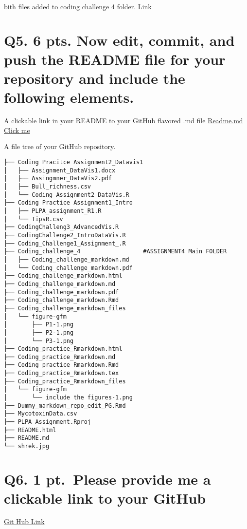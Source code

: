 \documentclass[
]{article}
\begin{document}
bith files added to coding challenge 4 folder.
\href{https://github.com/ppg0001/PLPA_Assignment/tree/main/Coding_challenge_4}{Link}

\section{Q5. 6 pts. Now edit, commit, and push the README file for your
repository and include the following
elements.}\label{q5.-6-pts.-now-edit-commit-and-push-the-readme-file-for-your-repository-and-include-the-following-elements.}

A clickable link in your README to your GitHub flavored .md file
\href{https://github.com/ppg0001/PLPA_Assignment/blob/main/Coding_challenge_4/Coding_challenge_markdown.md}{Readme.md
Click me}

A file tree of your GitHub repository.

\begin{verbatim}
├── Coding Pracitce Assignment2_Datavis1
│   ├── Assignment_DataVis1.docx
│   ├── Assingmner_DataVis2.pdf
│   ├── Bull_richness.csv
│   └── Coding_Assignment2_DataVis.R
├── Coding Practice Assignment1_Intro
│   ├── PLPA_assignment_R1.R
│   └── TipsR.csv
├── CodingChalleng3_AdvancedVis.R
├── CodingChallenge2_IntroDataVis.R
├── Coding_Challenge1_Assignment_.R
├── Coding_challenge_4                  #ASSIGNMENT4 Main FOLDER
│   ├── Coding_challenge_markdown.md
│   └── Coding_challenge_markdown.pdf
├── Coding_challenge_markdown.html
├── Coding_challenge_markdown.md
├── Coding_challenge_markdown.pdf
├── Coding_challenge_markdown.Rmd
├── Coding_challenge_markdown_files
│   └── figure-gfm
│       ├── P1-1.png
│       ├── P2-1.png
│       └── P3-1.png
├── Coding_practice_Rmarkdown.html
├── Coding_practice_Rmarkdown.md
├── Coding_practice_Rmarkdown.Rmd
├── Coding_practice_Rmarkdown.tex
├── Coding_practice_Rmarkdown_files
│   └── figure-gfm
│       └── include the figures-1.png
├── Dummy_markdown_repo_edit_PG.Rmd
├── MycotoxinData.csv
├── PLPA_Assignment.Rproj
├── README.html
├── README.md
└── shrek.jpg
\end{verbatim}

\section{Q6. 1 pt.~Please provide me a clickable link to your
GitHub}\label{q6.-1-pt.-please-provide-me-a-clickable-link-to-your-github}

\href{https://github.com/ppg0001/PLPA_Assignment/tree/main}{Git Hub
Link}
\end{document}

